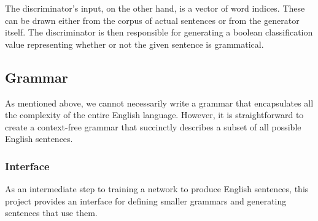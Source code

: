 \documentclass[12pt]{article}
\begin{document}
The discriminator's input, on the other hand, is a vector of word indices. These can be drawn either from the corpus of actual sentences or from the generator itself. The discriminator is then responsible for generating a boolean classification value representing whether or not the given sentence is grammatical.

\subsection{Grammar}

As mentioned above, we cannot necessarily write a grammar that encapsulates all the complexity of the entire English language. However, it is straightforward to create a context-free grammar that succinctly describes a subset of all possible English sentences.

\subsubsection{Interface}

As an intermediate step to training a network to produce English sentences, this project provides an interface for defining smaller grammars and generating sentences that use them.
\end{document}

